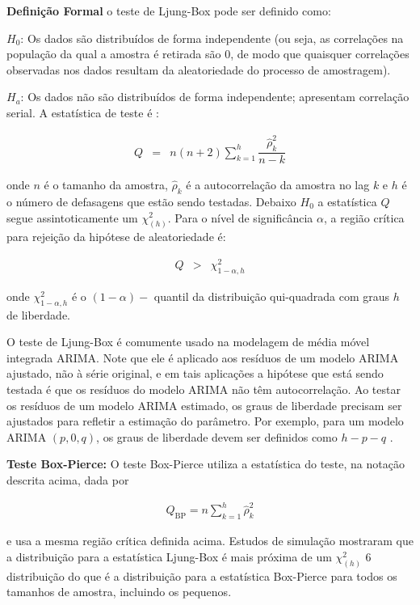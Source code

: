\noindent\textbf{Defini\c c\~ao Formal}
o teste de Ljung-Box pode ser definido como:

$H_0$: Os dados são distribuídos de forma independente (ou seja, as correlações na população da qual a amostra é retirada são 0, de modo que quaisquer correlações observadas nos dados resultam da aleatoriedade do processo de amostragem).

$H_a$: Os dados não são distribuídos de forma independente; apresentam correlação serial.
A estatística de teste é \cite{ljung}:

\begin{eqnarray}
	Q&=&n(n+2) \sum_{k=1}^h \dfrac{\hat{\rho}_k^2}{n-k}
\end{eqnarray}

\noindent onde $n$ é o tamanho da amostra, $\hat{\rho}_k$ é a autocorrelação da amostra no lag $k$ e $h$ é o número de defasagens que estão sendo testadas. Debaixo $H_0$ a estatística $Q$ segue assintoticamente um $\chi_{(h)}^2$. Para o nível de significância $\alpha$, a região crítica para rejeição da hipótese de aleatoriedade é:


\begin{eqnarray}
	Q&>&\chi_{1-\alpha, h}^2
\end{eqnarray}

\noindent onde $\chi_{1-\alpha, h}^2$ é o $(1-\alpha)-$ quantil \cite{Brockwell2002} da distribuição qui-quadrada com graus $h$ de liberdade.

O teste de Ljung-Box é comumente usado na modelagem de média móvel integrada ARIMA. Note que ele é aplicado aos resíduos de um modelo ARIMA ajustado, não à série original, e em tais aplicações a hipótese que está sendo testada é que os resíduos do modelo ARIMA não têm autocorrelação. Ao testar os resíduos de um modelo ARIMA estimado, os graus de liberdade precisam ser ajustados para refletir a estimação do parâmetro. Por exemplo, para um modelo ARIMA $(p,0,q)$, os graus de liberdade devem ser definidos como $h-p-q$ \cite{Davidson2000}.

\noindent\textbf{Teste Box-Pierce: }
O teste Box-Pierce utiliza a estatística do teste, na notação descrita acima, dada por \cite{box}

\begin{eqnarray}
	Q_{\mathrm{BP}}=n \sum_{k=1}^h \hat{\rho}_k^2
\end{eqnarray}

\noindent e usa a mesma região crítica definida acima.
Estudos de simulação mostraram que a distribuição para a estatística Ljung-Box é mais próxima de um $\chi^2_{(h)}$ 6 distribuição do que é a distribuição para a estatística Box-Pierce para todos os tamanhos de amostra, incluindo os pequenos.


